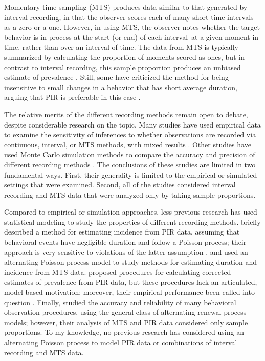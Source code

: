 \documentclass[11pt]{article}
\begin{document}
Momentary time sampling (MTS) produces data similar to that generated by interval recording, in that the observer scores each of many short time-intervals as a zero or a one. However, in using MTS, the observer notes whether the target behavior is in process at the start (or end) of each interval--at a given moment in time, rather than over an interval of time. The data from MTS is typically summarized by calculating the proportion of moments scored as ones, but in contrast to interval recording, this sample proportion produces an unbiased estimate of prevalence \citep{Rogosa1991statistical}. Still, some have criticized the method for being insensitive to small changes in a behavior that has short average duration, arguing that PIR is preferable in this case \citep{Harrop1986, Harrop1990use}.

The relative merits of the different recording methods remain open to debate, despite considerable research on the topic. Many studies have used empirical data to examine the sensitivity of inferences to whether observations are recorded via continuous, interval, or MTS methods, with mixed results \citep[e.g.,][]{Powell1975, Murphy1980, Bornstein2002, Gunter2003, Gardenier2004, Rapp2007interval, Alvero2007}. Other studies have used Monte Carlo simulation methods to compare the accuracy and precision of different recording methods \citep[e.g.,][]{Harrop1986, Rapp2008detecting}. The conclusions of these studies are limited in two fundamental ways. First, their generality is limited to the empirical or simulated settings that were examined. Second, all of the studies considered interval recording and MTS data that were analyzed only by taking sample proportions.

Compared to empirical or simulation approaches, less previous research has used statistical modeling to study the properties of different recording methods. \citet{Altmann1970estimating} briefly described a method for estimating incidence from PIR data, assuming that behavioral events have negligible duration and follow a Poisson process; their approach is very sensitive to violations of the latter assumption \citep{Fienberg1972on}. \citet{Brown1977estimation} and \citet{Griffin1983parametric} used an alternating Poisson process model to study methods for estimating duration and incidence from MTS data.  \citet{Suen1986post} proposed procedures for calculating corrected estimates of prevalence from PIR data, but these procedures lack an articulated, model-based motivation; moreover, their empirical performance been called into question \citep{Rogosa1991statistical}. Finally, \citet{Rogosa1991statistical} studied the accuracy and reliability of many behavioral observation procedures, using the general class of alternating renewal process models; however, their analysis of MTS and PIR data considered only sample proportions. To my knowledge, no previous research has considered using an alternating Poisson process to model PIR data or combinations of interval recording and MTS data.
\end{document}
